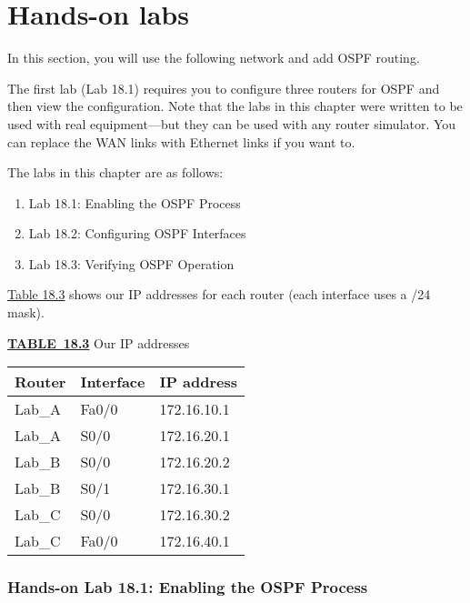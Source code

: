 \section{Hands-on labs}

In this section, you will use the following network and add OSPF
routing.

\begin{figure}
\centering
\caption{}
\end{figure}

\protect\hypertarget{c18.xhtmlux5cux23Page_773}{}{}The first lab (Lab
18.1) requires you to configure three routers for OSPF and then view the
configuration. Note that the labs in this chapter were written to be
used with real equipment---but they can be used with any router
simulator. You can replace the WAN links with Ethernet links if you want
to.

The labs in this chapter are as follows:

\begin{enumerate}
\tightlist
\item
  Lab 18.1: Enabling the OSPF Process
\item
  Lab 18.2: Configuring OSPF Interfaces
\item
  Lab 18.3: Verifying OSPF Operation
\end{enumerate}

\protect\hyperlink{c18.xhtmlux5cux23table18-3}{Table 18.3} shows our IP
addresses for each router (each interface uses a /24 mask).

{\protect\hyperlink{c18.xhtmlux5cux23tableanchor18-3}{\textbf{TABLE~18.3}}
Our IP addresses}

\begin{longtable}[]{@{}lll@{}}
\toprule
Router & Interface & IP address\tabularnewline
\midrule
\endhead
Lab\_A & Fa0/0 & 172.16.10.1\tabularnewline
Lab\_A & S0/0 & 172.16.20.1\tabularnewline
Lab\_B & S0/0 & 172.16.20.2\tabularnewline
Lab\_B & S0/1 & 172.16.30.1\tabularnewline
Lab\_C & S0/0 & 172.16.30.2\tabularnewline
Lab\_C & Fa0/0 & 172.16.40.1\tabularnewline
\bottomrule
\end{longtable}

\subsubsection[Hands-on Lab 18.1: Enabling the OSPF
Process]{\texorpdfstring{\protect\hypertarget{c18.xhtmlux5cux23c18-sec-21}{}{}Hands-on
Lab 18.1: Enabling the OSPF
Process}{Hands-on Lab 18.1: Enabling the OSPF Process}}

